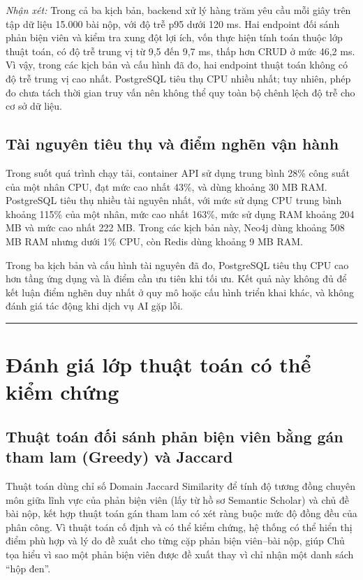 \textit{Nhận xét:} Trong cả ba kịch bản, backend xử lý hàng trăm yêu cầu mỗi giây trên tập dữ liệu 15.000 bài nộp, với độ trễ p95 dưới 120 ms. Hai endpoint đối sánh phản biện viên và kiểm tra xung đột lợi ích, vốn thực hiện tính toán thuộc lớp thuật toán, có độ trễ trung vị từ 9,5 đến 9,7 ms, thấp hơn CRUD ở mức 46,2 ms. Vì vậy, trong các kịch bản và cấu hình đã đo, hai endpoint thuật toán không có độ trễ trung vị cao nhất. PostgreSQL tiêu thụ CPU nhiều nhất; tuy nhiên, phép đo chưa tách thời gian truy vấn nên không thể quy toàn bộ chênh lệch độ trễ cho cơ sở dữ liệu.

\subsection{Tài nguyên tiêu thụ và điểm nghẽn vận hành}

Trong suốt quá trình chạy tải, container API sử dụng trung bình 28\% công suất của một nhân CPU, đạt mức cao nhất 43\%, và dùng khoảng 30 MB RAM. PostgreSQL tiêu thụ nhiều tài nguyên nhất, với mức sử dụng CPU trung bình khoảng 115\% của một nhân, mức cao nhất 163\%, mức sử dụng RAM khoảng 204 MB và mức cao nhất 222 MB. Trong các kịch bản này, Neo4j dùng khoảng 508 MB RAM nhưng dưới 1\% CPU, còn Redis dùng khoảng 9 MB RAM.

Trong ba kịch bản và cấu hình tài nguyên đã đo, PostgreSQL tiêu thụ CPU cao hơn tầng ứng dụng và là điểm cần ưu tiên khi tối ưu. Kết quả này không đủ để kết luận điểm nghẽn duy nhất ở quy mô hoặc cấu hình triển khai khác, và không đánh giá tác động khi dịch vụ AI gặp lỗi.

\par\noindent\rule{\textwidth}{0.4pt}\par

\section{Đánh giá lớp thuật toán có thể kiểm chứng}

\subsection{Thuật toán đối sánh phản biện viên bằng gán tham lam (Greedy) và Jaccard}

Thuật toán dùng chỉ số Domain Jaccard Similarity để tính độ tương đồng chuyên môn giữa lĩnh vực của phản biện viên (lấy từ hồ sơ Semantic Scholar) và chủ đề bài nộp, kết hợp thuật toán gán tham lam có xét ràng buộc mức độ đồng đều của phân công. Vì thuật toán cố định và có thể kiểm chứng, hệ thống có thể hiển thị điểm phù hợp và lý do đề xuất cho từng cặp phản biện viên--bài nộp, giúp Chủ tọa hiểu vì sao một phản biện viên được đề xuất thay vì chỉ nhận một danh sách ``hộp đen''.

